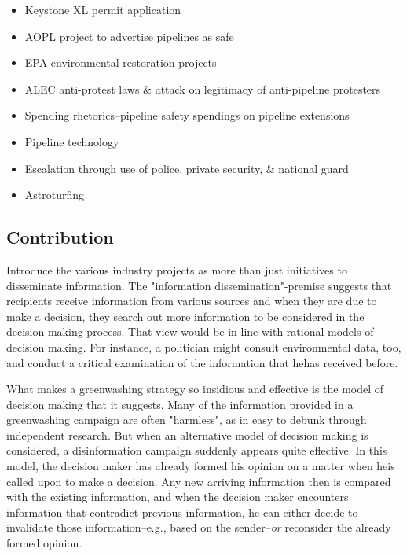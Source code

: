 \begin{itemize}
	\item Keystone XL permit application \citep{Stansbury2011}
	\item AOPL project to advertise pipelines as safe
	\item EPA environmental restoration projects
	\item ALEC anti-protest laws \& attack on legitimacy of anti-pipeline protesters
	\item Spending rhetorics--pipeline safety spendings on pipeline extensions
	\item Pipeline technology
	\item Escalation through use of police, private security, \& national guard
	\item Astroturfing
\end{itemize}

\subsection*{Contribution}

Introduce the various industry projects as more than just initiatives to disseminate information. The "information dissemination"-premise suggests that recipients receive information from various sources and when they are due to make a decision, they search out more information to be considered in the decision-making process. That view would be in line with rational models of decision making. For instance, a politician might consult environmental data, too, and conduct a critical examination of the information that he\footnotemark[\ref{note1}] has received before.

What makes a greenwashing strategy so insidious and effective is the model of decision making that it suggests. Many of the information provided in a greenwashing campaign are often "harmless", as in easy to debunk through independent research. But when an alternative model of decision making is considered, a disinformation campaign suddenly appears quite effective. In this model, the decision maker has already formed his opinion on a matter when he\footnotemark[\ref{note1}] is called upon to make a decision. Any new arriving information then is compared with the existing information, and when the decision maker encounters information that contradict previous information, he can either decide to invalidate those information--e.g., based on the sender--\textit{or} reconsider the already formed opinion.
